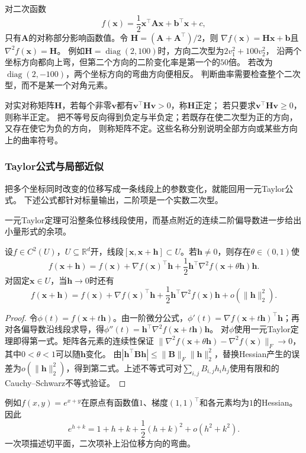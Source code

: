 对二次函数
\[   f(\bm{x})   =   \frac12\bm{x}^{\top}\bm{A}\bm{x}   +\bm{b}^{\top}\bm{x}+c, \]
只有$\bm{A}$的对称部分影响函数值。令 $\bm{H}=(\bm{A}+\bm{A}^{\top})/2$，则 $\nabla f(\bm{x})=\bm{H}\bm{x}+\bm{b}$且 $\nabla^2f(\bm{x})=\bm{H}$。
例如$\bm H=\operatorname{diag}(2,100)$时，方向二次型为$2v_1^2+100v_2^2$，
沿两个坐标方向都向上弯，但第二个方向的二阶变化率是第一个的$50$倍。
若改为$\operatorname{diag}(2,-100)$，两个坐标方向的弯曲方向便相反。
判断曲率需要检查整个二次型，而不是某一个对角元素。

对实对称矩阵$\bm H$，若每个非零$\bm v$都有$\bm v^\top\bm H\bm v>0$，称$\bm H$正定；
若只要求$\bm v^\top\bm H\bm v\geq0$，则称半正定。
把不等号反向得到负定与半负定；若既存在使二次型为正的方向，又存在使它为负的方向，
则称矩阵不定。这些名称分别说明全部方向或某些方向上的曲率符号。



\subsubsection{Taylor公式与局部近似}

把多个坐标同时改变的位移写成一条线段上的参数变化，就能回用一元Taylor公式。
下述公式都针对标量输出，二阶项是一个实数二次型。

一元Taylor定理可沿整条位移线段使用，而基点附近的连续二阶偏导数进一步给出小量形式的余项。
\begin{theorem}[多元标量函数的二阶Taylor公式]
\label{thm:multivariable-second-order-taylor}
设$f\in C^2(U)$，$U\subseteq\mathbb R^d$开，线段$[\bm x,\bm x+\bm h]\subset U$。若$\bm h\neq0$，则存在$\theta\in(0,1)$使
\begin{equation}
 f(\bm x+\bm h)=f(\bm x)+\nabla f(\bm x)^\top\bm h
 +\frac12\bm h^\top\nabla^2f(\bm x+\theta\bm h)\bm h.
\label{eq:analysis-second-order-taylor}
\end{equation}
对固定$\bm x\in U$，当$\bm h\to0$时还有
\begin{equation}
 f(\bm x+\bm h)=f(\bm x)+\nabla f(\bm x)^\top\bm h
 +\frac12\bm h^\top\nabla^2f(\bm x)\bm h+o(\lVert\bm h\rVert_2^2).
\label{eq:analysis-second-order-local-model}
\end{equation}
\end{theorem}
\begin{proof}
令$\phi(t)=f(\bm x+t\bm h)$。由一阶微分公式，$\phi'(t)=\nabla f(\bm x+t\bm h)^\top\bm h$；再对各偏导数沿线段求导，得$\phi''(t)=\bm h^\top\nabla^2f(\bm x+t\bm h)\bm h$。
对$\phi$使用一元Taylor定理即得第一式。矩阵各元素的连续性保证
$\lVert\nabla^2f(\bm x+\theta\bm h)-\nabla^2f(\bm x)\rVert_F\to0$，其中$0<\theta<1$可以随$\bm h$变化。
由$|\bm h^\top\bm B\bm h|\leq\lVert\bm B\rVert_F\lVert\bm h\rVert_2^2$，替换Hessian产生的误差为$o(\lVert\bm h\rVert_2^2)$，得到第二式。上述不等式可对$\sum_{i,j}B_{i,j}h_i h_j$使用有限和的Cauchy--Schwarz不等式验证。
\end{proof}
例如$f(x,y)=e^{x+y}$在原点有函数值$1$、梯度$(1,1)^\top$和各元素均为$1$的Hessian。因此
\[
 e^{h+k}=1+h+k+\frac12(h+k)^2+o(h^2+k^2).
\]
一次项描述切平面，二次项补上沿位移方向的弯曲。

